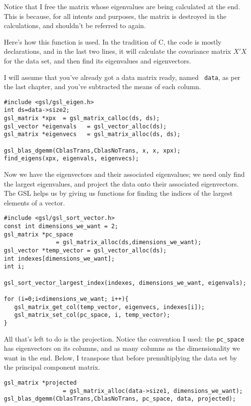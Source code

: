 Notice that I free the matrix whose eigenvalues are being calculated at the end.
This is because, for all intents and purposes, the matrix is destroyed in the
calculations, and shouldn't be referred to again. 

Here's how this function is used. In the tradition of C, the code is
mostly declarations, and in the last two lines, it will calculate the
covariance matrix $X'X$ for the data set, and then find its eigenvalues
and eigenvectors.

I will assume that you've already got a data matrix ready, named {\tt
data}, as per the last chapter, and you've subtracted the means of each
column.

\begin{verbatim}
#include <gsl/gsl_eigen.h>
int ds=data->size2;
gsl_matrix *xpx  = gsl_matrix_calloc(ds, ds);
gsl_vector *eigenvals   = gsl_vector_alloc(ds);
gsl_matrix *eigenvecs   = gsl_matrix_alloc(ds, ds);

gsl_blas_dgemm(CblasTrans,CblasNoTrans, x, x, xpx);
find_eigens(xpx, eigenvals, eigenvecs);
\end{verbatim}

Now we have the eigenvectors and their associated eigenvalues; we need only find
the largest eigenvalues, and project the data onto their associated eigenvectors.
The GSL helps us by giving us functions for
finding the indices of the largest elements of a vector.
\begin{verbatim}
#include <gsl/gsl_sort_vector.h>
const int dimensions_we_want = 2;
gsl_matrix *pc_space 
               = gsl_matrix_alloc(ds,dimensions_we_want);
gsl_vector *temp_vector = gsl_vector_alloc(ds);
int indexes[dimensions_we_want];
int i;

gsl_sort_vector_largest_index(indexes, dimensions_we_want, eigenvals);

for (i=0;i<dimensions_we_want; i++){
   gsl_matrix_get_col(temp_vector, eigenvecs, indexes[i]);
   gsl_matrix_set_col(pc_space, i, temp_vector);
}
\end{verbatim}

All that's left to do is the projection. Notice the convention I used:
the {\tt pc\_space} has eigenvectors on its columns, and as many columns as the
dimensionality we want in the end. Below, I transpose that before premultiplying
the data set by the principal component matrix.

\begin{verbatim}
gsl_matrix *projected 
                 = gsl_matrix_alloc(data->size1, dimensions_we_want);
gsl_blas_dgemm(CblasTrans,CblasNoTrans, pc_space, data, projected);
\end{verbatim}

